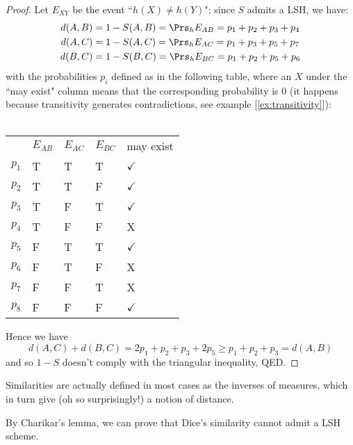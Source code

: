     \begin{proof}
        Let $E_{XY}$ be the event ``$h(X) \neq h(Y)$"; since $S$ admits a LSH, we have:
    	\begin{align*}
    		d(A,B) &= 1-S(A,B) = \Prs_h{E_{AB}} = p_1 + p_2 + p_3 + p_4 \\
    		d(A,C) &= 1-S(A,C) = \Prs_h{E_{AC}} = p_1 + p_3 + p_5 + p_7 \\
    		d(B,C) &= 1-S(B,C) = \Prs_h{E_{BC}} = p_1 + p_2 + p_5 + p_6
    	\end{align*}
    	with the probabilities $p_i$ defined as in the following table, where an $X$ under the ``may exist" column means that the corresponding probability is $0$ (it happens because transitivity generates contradictions, see example [\ref{ex:transitivity}]): \\\\
    	\begin{tabular}{lllll}
    		& $E_{AB}$ & $E_{AC}$ & $E_{BC}$ & may exist             \\
    		$p_1$ & T         & T         & T         & $\checkmark$ \\
    		$p_2$ & T         & T         & F         & $\checkmark$ \\
    		$p_3$ & T         & F         & T         & $\checkmark$ \\
    		$p_4$ & T         & F         & F         & X            \\
    		$p_5$ & F         & T         & T         & $\checkmark$ \\
    		$p_6$ & F         & T         & F         & X            \\
    		$p_7$ & F         & F         & T         & X            \\
    		$p_8$ & F         & F         & F         & $\checkmark$
    	\end{tabular}
    
    	Hence we have
    	\begin{equation*}
    		d(A,C) + d(B,C) = 2p_1 + p_2 + p_3 + 2p_5 \geq p_1 + p_2 + p_3 = d(A,B)
    	\end{equation*}
    	and so $1-S$ doesn't comply with the triangular inequality, QED.
    \end{proof}
	
	\obs Similarities are actually defined in most cases as the inverses of measures, which in turn give (oh so surprisingly!) a notion of distance.
	
	\begin{cor}
        By Charikar's lemma, we can prove that Dice's similarity cannot admit a LSH scheme.
    \end{cor}
    
